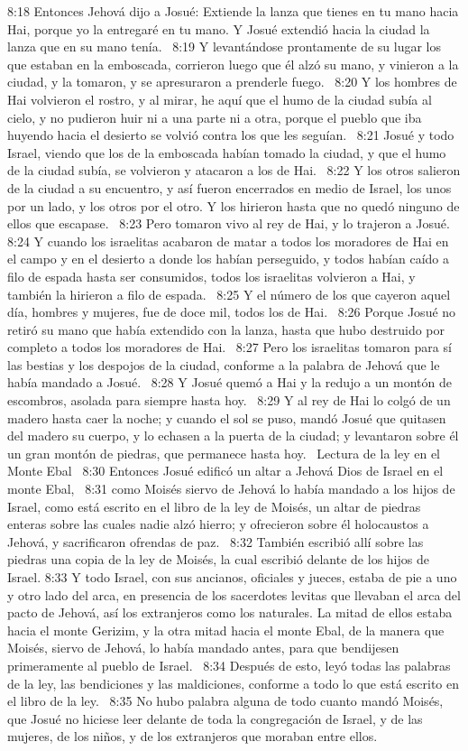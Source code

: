 8:18 Entonces Jehová dijo a Josué: Extiende la lanza que tienes en tu mano hacia Hai, porque yo la entregaré en tu mano. Y Josué extendió hacia la ciudad la lanza que en su mano tenía.  
8:19 Y levantándose prontamente de su lugar los que estaban en la emboscada, corrieron luego que él alzó su mano, y vinieron a la ciudad, y la tomaron, y se apresuraron a prenderle fuego.  
8:20 Y los hombres de Hai volvieron el rostro, y al mirar, he aquí que el humo de la ciudad subía al cielo, y no pudieron huir ni a una parte ni a otra, porque el pueblo que iba huyendo hacia el desierto se volvió contra los que les seguían.  
8:21 Josué y todo Israel, viendo que los de la emboscada habían tomado la ciudad, y que el humo de la ciudad subía, se volvieron y atacaron a los de Hai.  
8:22 Y los otros salieron de la ciudad a su encuentro, y así fueron encerrados en medio de Israel, los unos por un lado, y los otros por el otro. Y los hirieron hasta que no quedó ninguno de ellos que escapase.  
8:23 Pero tomaron vivo al rey de Hai, y lo trajeron a Josué.  
8:24 Y cuando los israelitas acabaron de matar a todos los moradores de Hai en el campo y en el desierto a donde los habían perseguido, y todos habían caído a filo de espada hasta ser consumidos, todos los israelitas volvieron a Hai, y también la hirieron a filo de espada.  
8:25 Y el número de los que cayeron aquel día, hombres y mujeres, fue de doce mil, todos los de Hai.  
8:26 Porque Josué no retiró su mano que había extendido con la lanza, hasta que hubo destruido por completo a todos los moradores de Hai.  
8:27 Pero los israelitas tomaron para sí las bestias y los despojos de la ciudad, conforme a la palabra de Jehová que le había mandado a Josué.  
8:28 Y Josué quemó a Hai y la redujo a un montón de escombros, asolada para siempre hasta hoy.  
8:29 Y al rey de Hai lo colgó de un madero hasta caer la noche; y cuando el sol se puso, mandó Josué que quitasen del madero su cuerpo, y lo echasen a la puerta de la ciudad; y levantaron sobre él un gran montón de piedras, que permanece hasta hoy.  
Lectura de la ley en el Monte Ebal  
8:30 Entonces Josué edificó un altar a Jehová Dios de Israel en el monte Ebal,  
8:31 como Moisés siervo de Jehová lo había mandado a los hijos de Israel, como está escrito en el libro de la ley de Moisés, un altar de piedras enteras sobre las cuales nadie alzó hierro; y ofrecieron sobre él holocaustos a Jehová, y sacrificaron ofrendas de paz.  
8:32 También escribió allí sobre las piedras una copia de la ley de Moisés, la cual escribió delante de los hijos de Israel. 
8:33 Y todo Israel, con sus ancianos, oficiales y jueces, estaba de pie a uno y otro lado del arca, en presencia de los sacerdotes levitas que llevaban el arca del pacto de Jehová, así los extranjeros como los naturales. La mitad de ellos estaba hacia el monte Gerizim, y la otra mitad hacia el monte Ebal, de la manera que Moisés, siervo de Jehová, lo había mandado antes, para que bendijesen primeramente al pueblo de Israel.  
8:34 Después de esto, leyó todas las palabras de la ley, las bendiciones y las maldiciones, conforme a todo lo que está escrito en el libro de la ley.  
8:35 No hubo palabra alguna de todo cuanto mandó Moisés, que Josué no hiciese leer delante de toda la congregación de Israel, y de las mujeres, de los niños, y de los extranjeros que moraban entre ellos. 
